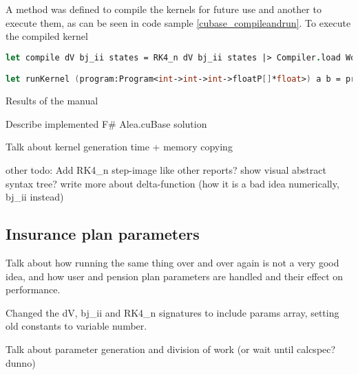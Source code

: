 A method was defined to compile the kernels for future use and another to execute them, as can be seen in code sample \ref{cubase_compileandrun}. 
To execute the compiled kernel

\begin{lstlisting}[language=FSharp, caption=Kernel compilation and execution methods in F\# Alea.cuBase, label=cubase_compileandrun]
let compile dV bj_ii states = RK4_n dV bj_ii states |> Compiler.load Worker.Default

let runKernel (program:Program<int->int->int->floatP[]*float>) a b = program.Run a b steps
\end{lstlisting}

Results of the manual 



Describe implemented F\# Alea.cuBase solution

Talk about kernel generation time + memory copying

other todo: 
	Add RK4\_n step-image like other reports? 
	show visual abstract syntax tree? 
	write more about delta-function (how it is a bad idea numerically, bj\_ii instead)



\subsection{Insurance plan parameters}
Talk about how running the same thing over and over again is not a very good idea, and how user and pension plan parameters are handled and their effect on performance.

Changed the dV, bj\_ii and RK4\_n signatures to include params array, setting old constants to variable number.

Talk about parameter generation and division of work (or wait until calcspec? dunno)